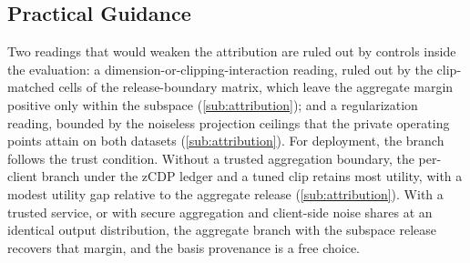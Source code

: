 \documentclass[a4paper,fleqn]{cas-dc}
\begin{document}
\subsection{Practical Guidance}
\label{subsec:guidance}
\par
Two readings that would weaken the attribution are ruled out by controls
inside the evaluation: a dimension-or-clipping-interaction reading, ruled out
by the clip-matched cells of the release-boundary matrix, which leave the
aggregate margin positive only within the subspace
(\cref{sub:attribution}); and a regularization reading, bounded by
the noiseless projection ceilings that the private operating points attain on
both datasets (\cref{sub:attribution}). For deployment, the branch
follows the trust condition. Without a trusted aggregation boundary, the
per-client branch under the zCDP ledger and a tuned clip retains most
utility, with a modest utility gap relative to the aggregate release
(\cref{sub:attribution}). With a trusted service, or with secure aggregation and
client-side noise shares at an identical output distribution, the aggregate
branch with the subspace release recovers that margin, and the basis
provenance is a free choice.
\par
\end{document}
